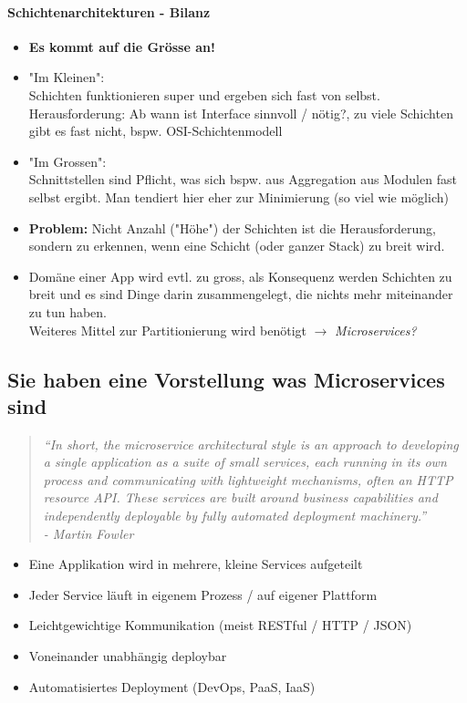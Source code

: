 \documentclass[a4paper]{article}
\begin{document}
			\paragraph{Schichtenarchitekturen - Bilanz}
			
			\begin{itemize}
				\item \textbf{Es kommt auf die Grösse an!}
				\item "Im Kleinen":\\
				Schichten funktionieren super und ergeben sich fast von selbst.\\
				Herausforderung: Ab wann ist Interface sinnvoll / nötig?, zu viele Schichten gibt es fast nicht, bspw. OSI-Schichtenmodell
				\item "Im Grossen":\\
				Schnittstellen sind Pflicht, was sich bspw. aus Aggregation aus Modulen fast selbst ergibt. Man tendiert hier eher zur Minimierung (so viel wie möglich)
				\item \textbf{Problem:} Nicht Anzahl ("Höhe") der Schichten ist die Herausforderung, sondern zu erkennen, wenn eine Schicht (oder ganzer Stack) zu breit wird.
				\item Domäne einer App wird evtl. zu gross, als Konsequenz werden Schichten zu breit und es sind Dinge darin zusammengelegt, die nichts mehr miteinander zu tun haben.\\
				Weiteres Mittel zur Partitionierung wird benötigt $\rightarrow$ \textit{Microservices?}
			\end{itemize}
		
		
		\subsection{Sie haben eine Vorstellung was Microservices sind}
		
		\begin{quote}
			\textit{“In short, the microservice architectural style is an approach to developing a single application as a suite of small services, each running in its own process and communicating with lightweight mechanisms, often an HTTP resource API. These services are built around business capabilities and independently deployable by fully automated deployment machinery.”\\
			- Martin Fowler}
		\end{quote}
		
		\begin{itemize}
			\item Eine Applikation wird in mehrere, kleine Services aufgeteilt
			\item Jeder Service läuft in eigenem Prozess / auf eigener Plattform
			\item Leichtgewichtige Kommunikation (meist RESTful / HTTP / JSON)
			\item Voneinander unabhängig deploybar
			\item Automatisiertes Deployment (DevOps, PaaS, IaaS)
		\end{itemize}
	
\end{document}
